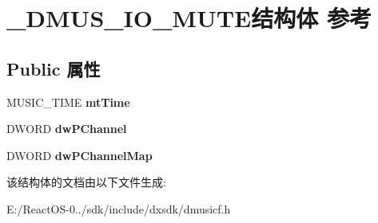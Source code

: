 \hypertarget{struct___d_m_u_s___i_o___m_u_t_e}{}\section{\+\_\+\+D\+M\+U\+S\+\_\+\+I\+O\+\_\+\+M\+U\+T\+E结构体 参考}
\label{struct___d_m_u_s___i_o___m_u_t_e}
\subsection*{Public 属性}
\begin{DoxyCompactItemize}
\item 
\mbox{\label{struct___d_m_u_s___i_o___m_u_t_e_ae3ad7517d0174462ff02d2bd58214737}} 
M\+U\+S\+I\+C\+\_\+\+T\+I\+ME {\bfseries mt\+Time}
\item 
\mbox{\label{struct___d_m_u_s___i_o___m_u_t_e_a5fb25bc1431cf9872cf0105012bf79d0}} 
D\+W\+O\+RD {\bfseries dw\+P\+Channel}
\item 
\mbox{\label{struct___d_m_u_s___i_o___m_u_t_e_a87e662988ba8c7a471300e842cf885e1}} 
D\+W\+O\+RD {\bfseries dw\+P\+Channel\+Map}
\end{DoxyCompactItemize}


该结构体的文档由以下文件生成\+:\begin{DoxyCompactItemize}
\item 
E\+:/\+React\+O\+S-\/0../sdk/include/dxsdk/dmusicf.\+h\end{DoxyCompactItemize}

